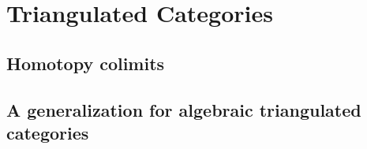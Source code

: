 \documentclass[../../../thesis.tex]{subfiles}
\begin{document}
    
    \section{Triangulated Categories}

        \subsection{Homotopy colimits}

        \subsection{A generalization for algebraic triangulated categories}
\end{document}
